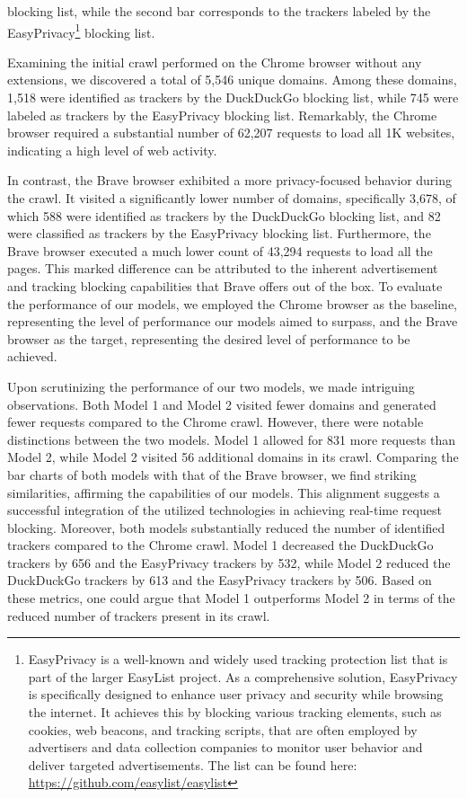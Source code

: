 blocking list, while the second bar corresponds to the trackers labeled by the EasyPrivacy\footnote{EasyPrivacy is a well-known and widely used tracking protection list that is part of the larger EasyList project. As a comprehensive solution, EasyPrivacy is specifically designed to enhance user privacy and security while browsing the internet. It achieves this by blocking various tracking elements, such as cookies, web beacons, and tracking scripts, that are often employed by advertisers and data collection companies to monitor user behavior and deliver targeted advertisements. The list can be found here: \url{https://github.com/easylist/easylist}} blocking list.

Examining the initial crawl performed on the Chrome browser without any extensions, we discovered a total of 5,546 unique
domains. Among these domains, 1,518 were identified as trackers by the DuckDuckGo blocking list, while 745 were labeled
as trackers by the EasyPrivacy blocking list. Remarkably, the Chrome browser required a substantial number of 62,207
requests to load all 1K websites, indicating a high level of web activity.

In contrast, the Brave browser exhibited a more privacy-focused behavior during the crawl. It visited a significantly
lower number of domains, specifically 3,678, of which 588 were identified as trackers by the DuckDuckGo blocking list, and 82 were
classified as trackers by the EasyPrivacy blocking list. Furthermore, the Brave browser executed a much lower count of 43,294
requests to load all the pages. This marked difference can be attributed to the inherent advertisement and tracking blocking capabilities 
that Brave offers out of the box. To evaluate the performance of our models, we employed the Chrome browser as the baseline,
representing the level of performance our models aimed to surpass, and the Brave browser as the target, representing the desired
level of performance to be achieved.

Upon scrutinizing the performance of our two models, we made intriguing observations. Both Model 1 and Model 2 visited fewer
domains and generated fewer requests compared to the Chrome crawl. However, there were notable distinctions between the two models.
Model 1 allowed for 831 more requests than Model 2, while Model 2 visited 56 additional domains in its crawl. Comparing the bar charts
of both models with that of the Brave browser, we find striking similarities, affirming the capabilities of our models. This alignment
suggests a successful integration of the utilized technologies in achieving real-time request blocking. Moreover, both models
substantially reduced the number of identified trackers compared to the Chrome crawl. Model 1 decreased the DuckDuckGo trackers
by 656 and the EasyPrivacy trackers by 532, while Model 2 reduced the DuckDuckGo trackers by 613 and the EasyPrivacy trackers
by 506. Based on these metrics, one could argue that Model 1 outperforms Model 2 in terms of the reduced number of trackers
present in its crawl.

